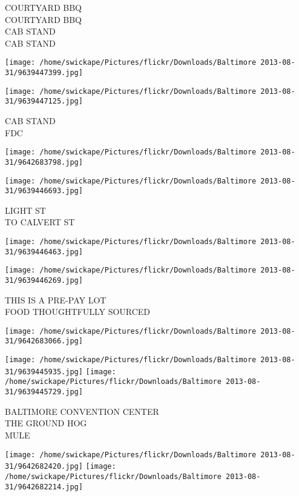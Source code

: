 \documentclass[10pt,letterpaper]{article}
\begin{document}
COURTYARD BBQ\\
COURTYARD BBQ\\
CAB STAND\\
CAB STAND
\pagebreak

\texttt{[image: /home/swickape/Pictures/flickr/Downloads/Baltimore 2013-08-31/9639447399.jpg]}

\vspace{0.25in}
\texttt{[image: /home/swickape/Pictures/flickr/Downloads/Baltimore 2013-08-31/9639447125.jpg]}

CAB STAND\\
FDC
\pagebreak

\texttt{[image: /home/swickape/Pictures/flickr/Downloads/Baltimore 2013-08-31/9642683798.jpg]}

\vspace{0.25in}
\texttt{[image: /home/swickape/Pictures/flickr/Downloads/Baltimore 2013-08-31/9639446693.jpg]}

LIGHT ST\\
TO CALVERT ST
\pagebreak

\texttt{[image: /home/swickape/Pictures/flickr/Downloads/Baltimore 2013-08-31/9639446463.jpg]}

\vspace{0.25in}
\texttt{[image: /home/swickape/Pictures/flickr/Downloads/Baltimore 2013-08-31/9639446269.jpg]}

THIS IS A PRE{-}PAY LOT\\
FOOD THOUGHTFULLY SOURCED
\pagebreak

\texttt{[image: /home/swickape/Pictures/flickr/Downloads/Baltimore 2013-08-31/9642683066.jpg]}

\vspace{0.25in}
\texttt{[image: /home/swickape/Pictures/flickr/Downloads/Baltimore 2013-08-31/9639445935.jpg]}
\texttt{[image: /home/swickape/Pictures/flickr/Downloads/Baltimore 2013-08-31/9639445729.jpg]}

BALTIMORE CONVENTION CENTER\\
THE GROUND HOG\\
MULE
\pagebreak

\texttt{[image: /home/swickape/Pictures/flickr/Downloads/Baltimore 2013-08-31/9642682420.jpg]}
\texttt{[image: /home/swickape/Pictures/flickr/Downloads/Baltimore 2013-08-31/9642682214.jpg]}
\end{document}
